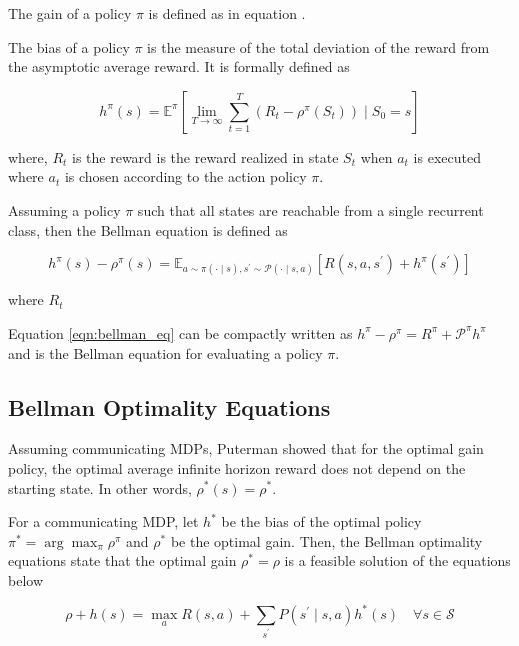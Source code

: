 The gain of a policy $\pi$ is defined as in equation \cite{eqn:gain}.

The bias of a policy $\pi$ is the measure of the total deviation of the reward from the asymptotic average reward.
It is formally defined as

\begin{equation}
    \label{eqn:bias}
    h^\pi(s) = \mathbb{E}^\pi\left[\lim_{T \to \infty} \sum_{t=1}^{T} (R_t - \rho^\pi(S_t)) \mid S_0 = s\right]
\end{equation}

where, $R_t$ is the reward is the reward realized in state $S_t$ when $a_t$ is executed where $a_t$ is chosen according to the action policy $\pi$.

Assuming a policy $\pi$ such that all states are reachable from a single recurrent class, then the Bellman equation is defined as

\begin{equation}
    \label{eqn:bellman_eq}
    h^\pi(s) - \rho^\pi(s) = \mathbb{E}_{a \sim \pi(\cdot \mid s), s^\prime \sim \mathcal{P}(\cdot \mid  s, a)} \left[ R(s, a, s^\prime) + h^\pi(s^\prime) \right]
\end{equation}

where $R_t$

Equation \ref{eqn:bellman_eq} can be compactly written as $h^\pi - \rho^\pi = R^\pi + \mathcal{P}^\pi h^\pi$ and is the Bellman equation for evaluating a policy $\pi$.

\subsection{Bellman Optimality Equations}

Assuming communicating MDPs, Puterman \cite{puterman_chapter_1990} showed that for the optimal gain policy, the optimal average infinite horizon reward does not depend on the starting state. In other words, $\rho^*(s) = \rho^*$.

For a communicating MDP, let $h^*$ be the bias of the optimal policy $\pi^* = \arg \max_\pi \rho^\pi$ and $\rho^*$ be the optimal gain. 
Then, the Bellman optimality equations state that the optimal gain $\rho^* = \rho$ is a feasible solution of the equations below 

\begin{equation}
    \rho + h(s) = \max_a R(s, a) + \sum_{s^\prime} P(s^\prime \mid s, a) h^*(s) \quad \forall s \in \mathcal{S}
\end{equation}

